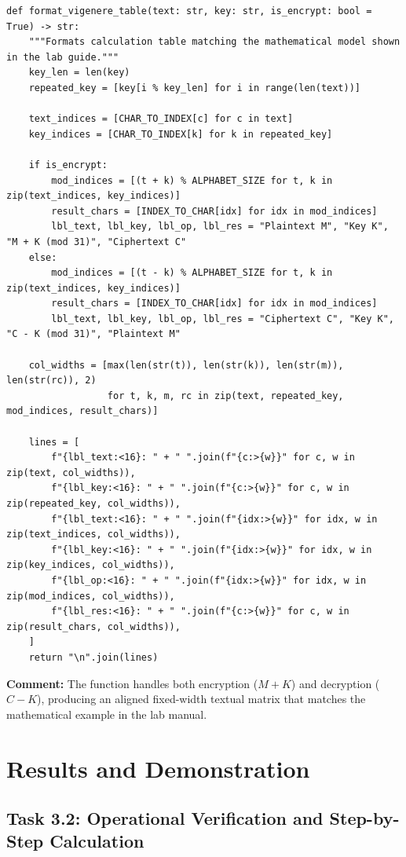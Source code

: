 \documentclass{labreport}
\begin{document}
\begin{lstlisting}[style=python]
def format_vigenere_table(text: str, key: str, is_encrypt: bool = True) -> str:
    """Formats calculation table matching the mathematical model shown in the lab guide."""
    key_len = len(key)
    repeated_key = [key[i % key_len] for i in range(len(text))]

    text_indices = [CHAR_TO_INDEX[c] for c in text]
    key_indices = [CHAR_TO_INDEX[k] for k in repeated_key]

    if is_encrypt:
        mod_indices = [(t + k) % ALPHABET_SIZE for t, k in zip(text_indices, key_indices)]
        result_chars = [INDEX_TO_CHAR[idx] for idx in mod_indices]
        lbl_text, lbl_key, lbl_op, lbl_res = "Plaintext M", "Key K", "M + K (mod 31)", "Ciphertext C"
    else:
        mod_indices = [(t - k) % ALPHABET_SIZE for t, k in zip(text_indices, key_indices)]
        result_chars = [INDEX_TO_CHAR[idx] for idx in mod_indices]
        lbl_text, lbl_key, lbl_op, lbl_res = "Ciphertext C", "Key K", "C - K (mod 31)", "Plaintext M"

    col_widths = [max(len(str(t)), len(str(k)), len(str(m)), len(str(rc)), 2)
                  for t, k, m, rc in zip(text, repeated_key, mod_indices, result_chars)]

    lines = [
        f"{lbl_text:<16}: " + " ".join(f"{c:>{w}}" for c, w in zip(text, col_widths)),
        f"{lbl_key:<16}: " + " ".join(f"{c:>{w}}" for c, w in zip(repeated_key, col_widths)),
        f"{lbl_text:<16}: " + " ".join(f"{idx:>{w}}" for idx, w in zip(text_indices, col_widths)),
        f"{lbl_key:<16}: " + " ".join(f"{idx:>{w}}" for idx, w in zip(key_indices, col_widths)),
        f"{lbl_op:<16}: " + " ".join(f"{idx:>{w}}" for idx, w in zip(mod_indices, col_widths)),
        f"{lbl_res:<16}: " + " ".join(f"{c:>{w}}" for c, w in zip(result_chars, col_widths)),
    ]
    return "\n".join(lines)
\end{lstlisting}
\textbf{Comment:} The function handles both encryption ($M+K$) and decryption ($C-K$), producing an aligned fixed-width textual matrix that matches the mathematical example in the lab manual.

\section{Results and Demonstration}

\subsection{Task 3.2: Operational Verification and Step-by-Step Calculation}
\end{document}
